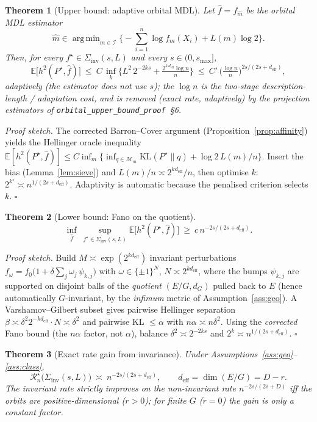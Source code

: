 \documentclass[11pt]{article}
\theoremstyle{plain}
\newtheorem{theorem}{Theorem}[section]
\theoremstyle{definition}
\theoremstyle{remark}
\newcommand{\E}{\mathbb{E}}
\newcommand{\KL}{\mathrm{KL}}
\DeclareMathOperator*{\argmin}{arg\,min}
\DeclareMathOperator{\dimm}{dim}
\begin{document}
\begin{theorem}[Upper bound: adaptive orbital MDL]\label{thm:upper}
Let $\widehat f=f_{\widehat m}$ be the orbital MDL estimator
\[
\widehat m\in\argmin_{m\in\mathcal I}\Big\{-\textstyle\sum_{i=1}^n\log f_m(X_i)+L(m)\log2\Big\}.
\]
Then, for every $f^\star\in\Sigma_{\mathrm{inv}}(s,L)$ and every $s\in(0,s_{\max}]$,
\[
\E\big[h^2(P^\star,\widehat f)\big]
\ \le\ C\,\inf_{k}\Big\{L^2\,2^{-2ks}+\tfrac{2^{k\,d_{\mathrm{eff}}}\log n}{n}\Big\}
\ \le\ C'\,\Big(\tfrac{\log n}{n}\Big)^{2s/(2s+d_{\mathrm{eff}})},
\]
\emph{adaptively} (the estimator does not use $s$); the $\log n$ is the two-stage
description-length / adaptation cost, and is removed (exact rate, adaptively) by
the projection estimators of \texttt{orbital\_upper\_bound\_proof}~\S6.
\end{theorem}

\noindent\emph{Proof sketch.} The corrected Barron--Cover argument
(Proposition~\ref{prop:affinity}) yields the Hellinger oracle inequality
$\E[h^2(P^\star,\widehat f)]\le C\inf_m\{\inf_{q\in\mathcal M_m}\KL(P^\star\|q)+\log2\,L(m)/n\}$.
Insert the bias (Lemma~\ref{lem:sieve}) and $L(m)/n\asymp 2^{k d_{\mathrm{eff}}}/n$,
then optimise $k$: $2^{k^\star}\asymp n^{1/(2s+d_{\mathrm{eff}})}$. Adaptivity is
automatic because the penalised criterion selects $k$. \hfill$\square$

\begin{theorem}[Lower bound: Fano on the quotient]\label{thm:lower}
\[
\inf_{\widehat f}\ \sup_{f^\star\in\Sigma_{\mathrm{inv}}(s,L)}
\E\big[h^2(P^\star,\widehat f)\big]\ \ge\ c\,n^{-2s/(2s+d_{\mathrm{eff}})}.
\]
\end{theorem}

\noindent\emph{Proof sketch.} Build $M\asymp\exp(2^{k d_{\mathrm{eff}}})$ invariant
perturbations $f_\omega=f_0\big(1+\delta\sum_{j}\omega_j\,\psi_{k,j}\big)$ with
$\omega\in\{\pm1\}^{N}$, $N\asymp2^{k d_{\mathrm{eff}}}$, where the bumps
$\psi_{k,j}$ are supported on disjoint balls of the \emph{quotient}
$(E/G,d_G)$ pulled back to $E$ (hence automatically $G$-invariant, by the
\emph{infimum} metric of Assumption~\ref{ass:geo}). A Varshamov--Gilbert subset
gives pairwise Hellinger separation $\beta\asymp\delta^2 2^{-k d_{\mathrm{eff}}}\cdot N\asymp\delta^2$
and pairwise KL $\le\alpha$ with $n\alpha\asymp n\delta^2$. Using the
\emph{corrected} Fano bound (the $n\alpha$ factor, not $\alpha$), balance
$\delta^2\asymp 2^{-2ks}$ and $2^{k}\asymp n^{1/(2s+d_{\mathrm{eff}})}$. \hfill$\square$

\begin{theorem}[Exact rate gain from invariance]\label{thm:main}
Under Assumptions~\ref{ass:geo}--\ref{ass:class},
\[
\boxed{\ \mathcal R_n^\star\big(\Sigma_{\mathrm{inv}}(s,L)\big)\ \asymp\ n^{-2s/(2s+d_{\mathrm{eff}})},
\qquad d_{\mathrm{eff}}=\dimm(E/G)=D-r.\ }
\]
The invariant rate strictly improves on the non-invariant rate
$n^{-2s/(2s+D)}$ \emph{iff} the orbits are positive-dimensional ($r>0$); for
finite $G$ ($r=0$) the gain is only a constant factor.
\end{theorem}
\end{document}
